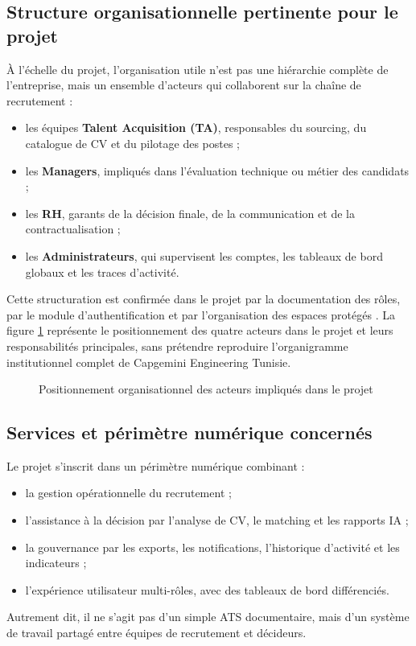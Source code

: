 \subsection{Structure organisationnelle pertinente pour le projet}
À l'échelle du projet, l'organisation utile n'est pas une hiérarchie complète de l'entreprise, mais un ensemble d'acteurs qui collaborent sur la chaîne de recrutement :
\begin{itemize}
  \item les équipes \textbf{Talent Acquisition (TA)}, responsables du sourcing, du catalogue de CV et du pilotage des postes ;
  \item les \textbf{Managers}, impliqués dans l'évaluation technique ou métier des candidats ;
  \item les \textbf{RH}, garants de la décision finale, de la communication et de la contractualisation ;
  \item les \textbf{Administrateurs}, qui supervisent les comptes, les tableaux de bord globaux et les traces d'activité.
\end{itemize}
Cette structuration est confirmée dans le projet par la documentation des rôles, par le module d'authentification et par l'organisation des espaces protégés . La figure \ref{fig:organization-positioning} représente le positionnement des quatre acteurs dans le projet et leurs responsabilités principales, sans prétendre reproduire l'organigramme institutionnel complet de Capgemini Engineering Tunisie.

\begin{figure}[H]
  \centering
  \caption{\label{fig:organization-positioning}Positionnement organisationnel des acteurs impliqués dans le projet}
\end{figure}

\subsection{Services et périmètre numérique concernés}
Le projet s'inscrit dans un périmètre numérique combinant :
\begin{itemize}
  \item la gestion opérationnelle du recrutement ;
  \item l'assistance à la décision par l'analyse de CV, le matching et les rapports IA ;
  \item la gouvernance par les exports, les notifications, l'historique d'activité et les indicateurs ;
  \item l'expérience utilisateur multi-rôles, avec des tableaux de bord différenciés.
\end{itemize}
Autrement dit, il ne s'agit pas d'un simple ATS documentaire, mais d'un système de travail partagé entre équipes de recrutement et décideurs.

